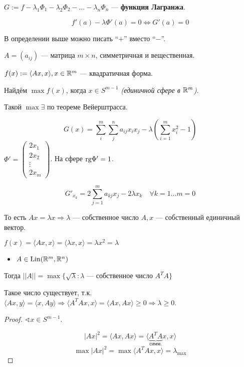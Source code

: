 \begin{definition}
    $G := f - \lambda_1 \Phi_1 - \lambda_2 \Phi_2 - \ldots - \lambda_n \Phi_n$ --- \textbf{функция Лагранжа}.
\end{definition}

$$f'(a) - \lambda\Phi'(a) = 0 \Leftrightarrow G'(a) = 0$$

\begin{remark}
    В определении выше можно писать ``$+$'' вместо ``$-$''.
\end{remark}

\begin{example}
    $A=(a_{ij})$ --- матрица $m \times n$, симметричная и вещественная.

    $f(x) := \langle Ax, x\rangle, x\in \mathbb{R}^m$ --- квадратичная форма.

    Найдём $\max f(x)$, когда $x\in S^{m-1}$ \textit{(единичной сфере в $\mathbb{R}^m$)}.

    Такой $\max \exists$ по теореме Вейерштрасса.

    $$G(x) = \sum_{i}^m \sum_{j}^n a_{ij} x_i x_j - \lambda \left(\sum_{i=1}^m x_i^2 - 1\right)$$
    $\Phi' = \begin{pmatrix}
            2x_1   \\
            2x_2   \\
            \vdots \\
            2x_m
        \end{pmatrix}$. На сфере $\text{rg} \Phi'=1$.

    $$G'_{x_k} = 2\sum_{j=1}^m a_{kj} x_j - 2\lambda x_k \quad \forall k = 1\ldots m = 0$$

    То есть $Ax = \lambda x \Rightarrow \lambda$ --- собственное число $A, x$ --- собственный единичный вектор.

    $f(x) = \langle Ax, x\rangle = \langle \lambda x, x\rangle = \lambda x^2 = \lambda$
\end{example}

\begin{theorem}\itemfix
    \begin{itemize}
        \item $A \in \text{Lin}(\mathbb{R}^m, \mathbb{R}^n)$
    \end{itemize}
    Тогда $||A|| = \max\{\sqrt{\lambda} : \lambda \text{ --- собственное число } A^TA\}$

    Такое число существует, т.к. $\langle Ax, y\rangle = \langle x, Ay\rangle \Rightarrow \langle A^T Ax, x\rangle = \langle Ax, Ax\rangle \ge 0 \Rightarrow \lambda \ge 0$.
\end{theorem}
\begin{proof}
    $\sphericalangle x\in S^{m-1}$.

    $$|Ax|^2 = \langle Ax, Ax\rangle = \langle \underbrace{A^TA}_{\text{симм.}}x, x\rangle$$
    $$\max |Ax|^2 = \max \langle A^TAx, x\rangle = \lambda_{\max}$$
\end{proof}

